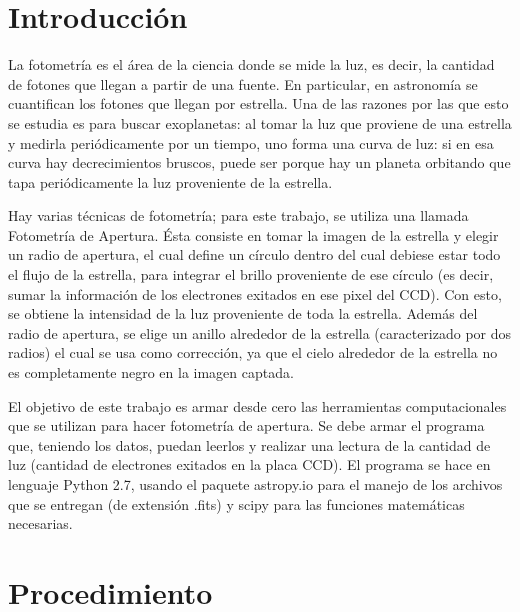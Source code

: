 \documentclass[a4paper, 11pt, spanish]{article}
\begin{document}
\clearpage


\newpage

\tableofcontents %
\listoffigures %

\newpage

\section{Introducci\'on}
La fotometr\'ia es el \'area de la ciencia donde se mide la luz, es decir, la cantidad de fotones que llegan a partir de una fuente. En particular, en astronom\'ia se cuantifican los fotones que llegan por estrella. Una de las razones por las que esto se estudia es para buscar exoplanetas: al tomar la luz que proviene de una estrella y medirla peri\'odicamente por un tiempo, uno forma una curva de luz: si en esa curva hay decrecimientos bruscos, puede ser porque hay un planeta orbitando que tapa peri\'odicamente la luz proveniente de la estrella. 

Hay varias t\'ecnicas de fotometr\'ia; para este trabajo, se utiliza una llamada Fotometr\'ia de Apertura. \'Esta consiste en tomar la imagen de la estrella y elegir un radio de apertura, el cual define un c\'irculo dentro del cual debiese estar todo el flujo de la estrella, para integrar el brillo proveniente de ese c\'irculo (es decir, sumar la informaci\'on de los electrones exitados en ese pixel del CCD). Con esto, se obtiene la intensidad de la luz proveniente de toda la estrella. Adem\'as del radio de apertura, se elige un anillo alrededor de la estrella (caracterizado por dos radios) el cual se usa como correcci\'on, ya que el cielo alrededor de la estrella no es completamente negro en la imagen captada.


El objetivo de este trabajo es armar desde cero las herramientas computacionales que se utilizan para hacer fotometr\'ia de apertura. Se debe armar el programa que, teniendo los datos, puedan leerlos y realizar una lectura de la cantidad de luz (cantidad de electrones exitados en la placa CCD). El programa se hace en lenguaje Python 2.7, usando el paquete astropy.io para el manejo de los archivos que se entregan (de extensi\'on .fits) y scipy para las funciones matem\'aticas necesarias.

\section{Procedimiento}
\end{document}
